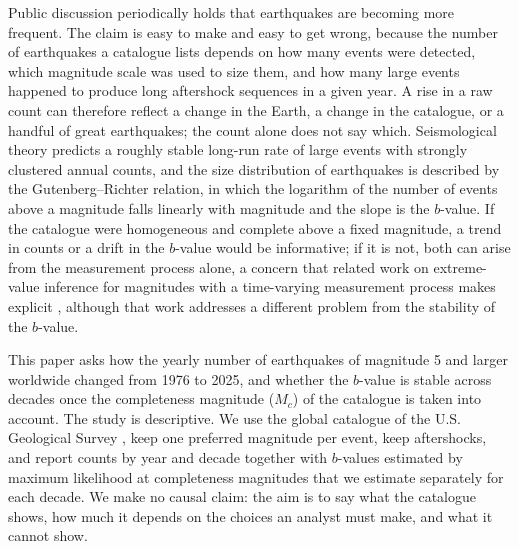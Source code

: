 \documentclass[11pt]{article}
\begin{document}
Public discussion periodically holds that earthquakes are becoming more frequent. The claim is easy to make and easy to get wrong, because the number of earthquakes a catalogue lists depends on how many events were detected, which magnitude scale was used to size them, and how many large events happened to produce long aftershock sequences in a given year. A rise in a raw count can therefore reflect a change in the Earth, a change in the catalogue, or a handful of great earthquakes; the count alone does not say which. Seismological theory predicts a roughly stable long-run rate of large events with strongly clustered annual counts, and the size distribution of earthquakes is described by the Gutenberg--Richter relation, in which the logarithm of the number of events above a magnitude falls linearly with magnitude and the slope is the $b$-value. If the catalogue were homogeneous and complete above a fixed magnitude, a trend in counts or a drift in the $b$-value would be informative; if it is not, both can arise from the measurement process alone, a concern that related work on extreme-value inference for magnitudes with a time-varying measurement process makes explicit \citep{varty2021inference}, although that work addresses a different problem from the stability of the $b$-value.

This paper asks how the yearly number of earthquakes of magnitude 5 and larger worldwide changed from 1976 to 2025, and whether the $b$-value is stable across decades once the completeness magnitude ($M_c$) of the catalogue is taken into account. The study is descriptive. We use the global catalogue of the U.S. Geological Survey \citep{USGS_ComCat}, keep one preferred magnitude per event, keep aftershocks, and report counts by year and decade together with $b$-values estimated by maximum likelihood at completeness magnitudes that we estimate separately for each decade. We make no causal claim: the aim is to say what the catalogue shows, how much it depends on the choices an analyst must make, and what it cannot show.
\end{document}
